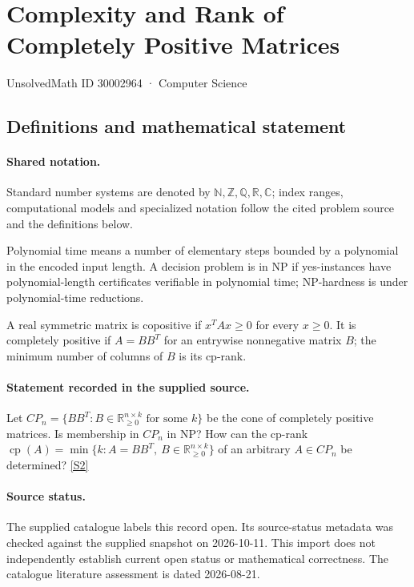 \documentclass[11pt]{article}
\newcommand{\sref}[2]{\hyperlink{source:#1:#2}{[S#2]}}
\begin{document}
\setcounter{section}{30002963}
\section{Complexity and Rank of Completely Positive Matrices}\label{30002964}
{\small\sffamily UnsolvedMath ID 30002964 · Computer Science}
\subsection{Definitions and mathematical statement}

\paragraph{Shared notation.}Standard number systems are denoted by $\mathbb N,\mathbb Z,\mathbb Q,\mathbb R,\mathbb C$; index ranges, computational models and specialized notation follow the cited problem source and the definitions below.


Polynomial time means a number of elementary steps bounded by a polynomial in the encoded input length. A decision problem is in $\mathrm{NP}$ if yes-instances have polynomial-length certificates verifiable in polynomial time; NP-hardness is under polynomial-time reductions.

A real symmetric matrix is copositive if $x^TAx\geq0$ for every $x\geq0$. It is completely positive if $A=BB^T$ for an entrywise nonnegative matrix $B$; the minimum number of columns of $B$ is its cp-rank.
\paragraph{Statement recorded in the supplied source.}
Let $CP_n=\{BB^T:B\in\mathbb R_{\geq0}^{n\times k}\text{ for some }k\}$ be the cone of completely positive matrices. Is membership in $CP_n$ in NP? How can the cp-rank $\operatorname{cp}(A)=\min\{k:A=BB^T,\ B\in\mathbb R_{\geq0}^{n\times k}\}$ of an arbitrary $A\in CP_n$ be determined? \sref{30002964}{2}
\paragraph{Source status.}
The supplied catalogue labels this record open. Its source-status metadata was checked against the supplied snapshot on 2026-10-11. This import does not independently establish current open status or mathematical correctness. The catalogue literature assessment is dated 2026-08-21.
\end{document}
